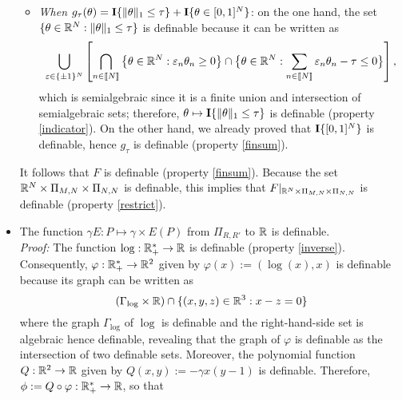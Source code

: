 \begin{itemize}
\begin{itemize}
  \item                                                          \textit{When}
    $g_{\tau}(\theta)  = \textbf{I}  \{\|\theta\|_{1} \leq  \tau\} +  \textbf{I}\{\theta \in
    [0,1]^{N}\}$:       on       the       one       hand,       the       set
    $\{\theta \in \mathbb{R}^{N} : \|\theta\|_{1}  \leq \tau\}$ is definable because
    it can be written as
    \begin{equation*}
      \bigcup_{\varepsilon  \in  \{\pm   1\}^{N}}  \left[\bigcap_{n  \in  \llbracket
          N\rrbracket} \big\{\theta \in \mathbb{R}^{N} : \varepsilon_{n} \theta_{n} \geq
        0\big\}  \cap \big\{\theta  \in  \mathbb{R}^{N} :  \sum_{n  \in  \llbracket
          N\rrbracket}\varepsilon_{n} \theta_{n} - \tau \leq 0\big\}\right],
    \end{equation*}
    which is  semialgebraic since  it is  a finite  union and  intersection of
    semialgebraic                       sets;                       therefore,
    $\theta \mapsto  \textbf{I} \{\|\theta\|_{1} \leq \tau\}$  is definable (property
    \ref{indicator}).    On   the  other   hand,   we   already  proved   that
    $\textbf{I}\{[0,1]^{N}\}$ is  definable, hence $g_{\tau}$ is  definable (property
    \ref{finsum}). 
  \end{itemize}
  It follows that  $F$ is definable (property \ref{finsum}).   Because the set
  $\mathbb{R}^{N} \times \Pi_{M,  N} \times \Pi_{N, N} $ is  definable, this implies
  that  $F|_{\mathbb{R}^{N}  \times  \Pi_{M,N}  \times  \Pi_{N,N}  }$  is  definable
  (property \ref{restrict}).
\item The function $\gamma E: P\mapsto \gamma \times E(P)$ from $\Pi_{R,R'}$
  to $\mathbb{R}$ is  definable.\\
  \textit{Proof:} The  function $\log  : \mathbb{R}_{+}^{*}  \to \mathbb{R}$  is definable
  (property                   \ref{inverse}).                    Consequently,
  $\varphi : \mathbb{R}_{+}^{*} \to \mathbb{R}^{2}$  given by $\varphi(x) := (\log(x), x)$
  is definable because its graph can be written as
  \begin{equation*}
    (\Gamma_{\log} \times \mathbb{R}) \cap \{(x,y,z) \in \mathbb{R}^{3} : x-z=0\}
  \end{equation*}
  where   the  graph   $\Gamma_{\log}$  of   $\log$  is   definable  and   the
  right-hand-side set is  algebraic hence definable, revealing  that the graph
  of  $\varphi$  is definable  as  the  intersection  of two  definable  sets.
  Moreover,   the  polynomial   function  $Q:\mathbb{R}^{2}   \to  \mathbb{R}$   given  by
  $Q(x,y)     :=     -\gamma     x(y-1)$     is     definable.      Therefore,
  $\phi:=     Q\circ    \varphi:\mathbb{R}_{+}^{*}     \to     \mathbb{R}$,    so     that

\end{itemize}
